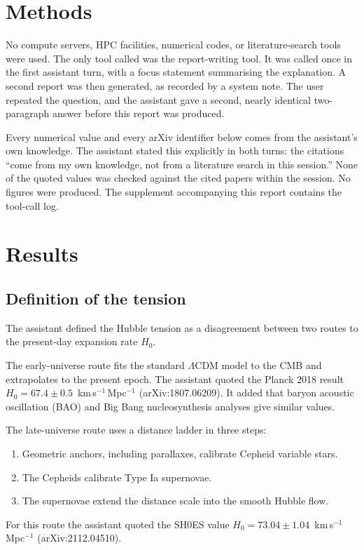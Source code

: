 \documentclass[11pt,a4paper]{article}
\begin{document}
\section{Methods}
No compute servers, HPC facilities, numerical codes, or literature-search tools were used. The only tool called was the report-writing tool. It was called once in the first assistant turn, with a focus statement summarising the explanation. A second report was then generated, as recorded by a system note. The user repeated the question, and the assistant gave a second, nearly identical two-paragraph answer before this report was produced.

Every numerical value and every arXiv identifier below comes from the assistant's own knowledge. The assistant stated this explicitly in both turns: the citations ``come from my own knowledge, not from a literature search in this session.'' None of the quoted values was checked against the cited papers within the session. No figures were produced. The supplement accompanying this report contains the tool-call log.

\section{Results}
\subsection{Definition of the tension}
The assistant defined the Hubble tension as a disagreement between two routes to the present-day expansion rate $H_0$.

The early-universe route fits the standard $\Lambda$CDM model to the CMB and extrapolates to the present epoch. The assistant quoted the Planck 2018 result $H_0 = 67.4 \pm 0.5$~km\,s$^{-1}$\,Mpc$^{-1}$ (arXiv:1807.06209). It added that baryon acoustic oscillation (BAO) and Big Bang nucleosynthesis analyses give similar values.

The late-universe route uses a distance ladder in three steps:
\begin{enumerate}
\item Geometric anchors, including parallaxes, calibrate Cepheid variable stars.
\item The Cepheids calibrate Type Ia supernovae.
\item The supernovae extend the distance scale into the smooth Hubble flow.
\end{enumerate}
For this route the assistant quoted the SH0ES value $H_0 = 73.04 \pm 1.04$~km\,s$^{-1}$\,Mpc$^{-1}$ (arXiv:2112.04510).
\end{document}
